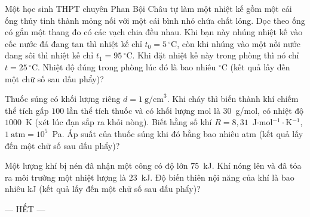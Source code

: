 	\begin{ex}%
		Một học sinh THPT chuyên Phan Bội Châu tự làm một nhiệt kế gồm một cái ống thủy tinh thành mỏng nối với một cái bình nhỏ chứa chất lỏng. Dọc theo ống có gắn một thang đo có các vạch chia đều nhau. Khi bạn này nhúng nhiệt kế vào cốc nước đá đang tan thì nhiệt kế chỉ $t_0=5\,^\circ\text{C}$, còn khi nhúng vào một nồi nước đang sôi thì nhiệt kế chỉ $t_1=95\,^\circ\text{C}$. Khi đặt nhiệt kế này trong phòng thì nó chỉ $t=25\,^\circ\text{C}$. Nhiệt độ đúng trong phòng lúc đó là bao nhiêu $^\circ$C (kết quả lấy đến một chữ số sau dấu phẩy)?
		\par
	\end{ex}

	\begin{ex}%
		Thuốc súng có khối lượng riêng $d=1~\text{g/cm}^3$. Khi cháy thì biến thành khí chiếm thể tích gấp $100$ lần thể tích thuốc và có khối lượng mol là $30$~g/mol, có nhiệt độ $1000$~K (xét lúc đạn sắp ra khỏi nòng). Biết hằng số khí $R=8{,}31$~J$\cdot$mol$^{-1}\cdot$K$^{-1}$, $1~\text{atm}=10^5$~Pa. Áp suất của thuốc súng khi đó bằng bao nhiêu atm (kết quả lấy đến một chữ số sau dấu phẩy)?
		\par
	\end{ex}

	\begin{ex}%
		Một lượng khí bị nén đã nhận một công có độ lớn $75$~kJ. Khí nóng lên và đã tỏa ra môi trường một nhiệt lượng là $23$~kJ. Độ biến thiên nội năng của khí là bao nhiêu kJ (kết quả lấy đến một chữ số sau dấu phẩy)?
		\par
	\end{ex}

	\centerline{--- HẾT ---}



